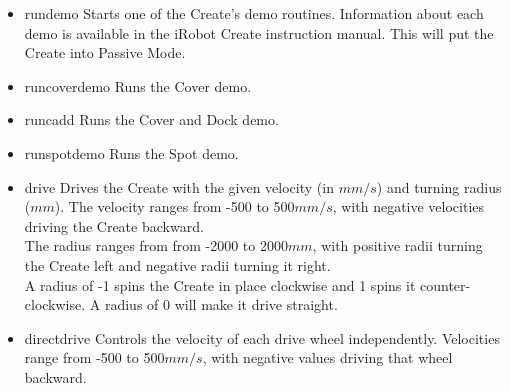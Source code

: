 \documentclass {article}
\begin{document}
\begin {itemize}
  \item {} {rundemo}
        Starts one of the Create's demo routines.  Information about each demo is available in the
        iRobot Create instruction manual.  This will put the Create into Passive Mode. \\
        \retnorm

  \item {} {runcoverdemo}
        Runs the Cover demo. \\
        \retnorm

  \item {} {runcadd}
        Runs the Cover and Dock demo. \\
        \retnorm

  \item {} {runspotdemo}
        Runs the Spot demo. \\
        \retnorm

  \item {} {drive}
        Drives the Create with the given velocity (in $mm/s$) and turning radius ($mm$).  The
        velocity ranges from -500 to 500$mm/s$, with negative velocities driving the Create
        backward. \\
        The radius ranges from from -2000 to 2000$mm$, with positive radii turning the Create left
        and negative radii turning it right. \\
        A radius of -1 spins the Create in place clockwise and 1 spins it counter-clockwise.  A
        radius of 0 will make it drive straight. \\
        \retnorm

  \item {} {directdrive}
        Controls the velocity of each drive wheel independently.  Velocities range from -500 to
        500$mm/s$, with negative values driving that wheel backward. \\
        \retnorm


\end{itemize}
\end{document}
